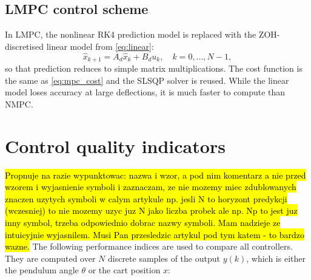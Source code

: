 \documentclass[twocolumn]{svjour3}
\begin{document}
\subsection{LMPC control scheme}

In LMPC, the nonlinear RK4 prediction model is replaced with the ZOH-discretised linear model
from \eqref{eq:linear}:
\begin{equation}
\hat{x}_{k+1} = A_d\hat{x}_k + B_du_k,\quad k=0,\ldots,N{-}1,
\end{equation}
so that prediction reduces to simple matrix multiplications. The cost function is the same as
\eqref{eq:mpc_cost} and the SLSQP solver is reused. While the linear model loses accuracy at
large deflections, it is much faster to compute than NMPC.

\section{Control quality indicators}
\hl{Propnuje na razie wypunktowac: nazwa i wzor, a pod nim komentarz a nie przed wzorem i wyjasnienie symboli i zaznaczam, ze nie mozemy miec zdublowanych znaczen uzytych symboli w calym artykule np. jesli N to horyzont predykcji (wczesniej) to nie mozemy uzyc juz N jako liczba probek ale np. Np to jest juz inny symbol, trzeba odpowiednio dobrac nazwy symboli. Mam nadzieje ze intuicyjnie wyjasnilem. Musi Pan przesledzic artykul pod tym katem - to bardzo wazne.}
The following performance indices are used to compare all controllers. They are computed over
$N$ discrete samples of the output $y(k)$, which is either the pendulum angle $\theta$ or the
cart position $x$:
\end{document}
